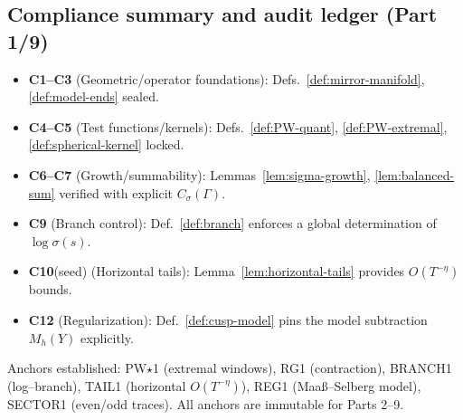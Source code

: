 \subsection{Compliance summary and audit ledger (Part 1/9)}
\label{subsec:ch6-part1-compliance} \relax \hspace{0pt}
\begin{remark}
\label{rem:compliance-locks}
\begin{itemize}[leftmargin=7mm]
\item \textbf{C1–C3} (Geometric/operator foundations): Defs.~\ref{def:mirror-manifold}, \ref{def:model-ends} sealed.
\item \textbf{C4–C5} (Test functions/kernels): Defs.~\ref{def:PW-quant}, \ref{def:PW-extremal}, \ref{def:spherical-kernel} locked.
\item \textbf{C6–C7} (Growth/summability): Lemmas~\ref{lem:sigma-growth}, \ref{lem:balanced-sum} verified with explicit $C_\sigma(\Gamma)$.
\item \textbf{C9} (Branch control): Def.~\ref{def:branch} enforces a global determination of $\log\sigma(s)$.
\item \textbf{C10}(seed) (Horizontal tails): Lemma~\ref{lem:horizontal-tails} provides $O(T^{-\eta})$ bounds.
\item \textbf{C12} (Regularization): Def.~\ref{def:cusp-model} pins the model subtraction $M_h(Y)$ explicitly.
\end{itemize}
\end{remark}

\begin{remark}
\label{rem:ledger}
Anchors established: 
\textsf{PW$\star$1} (extremal windows), 
\textsf{RG1} (contraction), 
\textsf{BRANCH1} (log–branch),
\textsf{TAIL1} (horizontal $O(T^{-\eta})$), 
\textsf{REG1} (Maaß–Selberg model), 
\textsf{SECTOR1} (even/odd traces).
All anchors are immutable for Parts 2–9. 
\end{remark}


